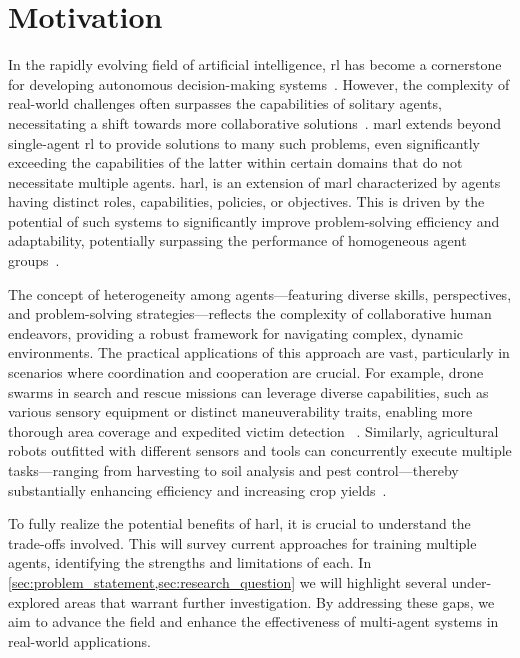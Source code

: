 \section{Motivation}%
\label{sec:motivation}

In the rapidly evolving field of artificial intelligence, \gls{rl} has become a 
cornerstone for developing autonomous decision-making systems~\cite{sutton2018}.
However, the complexity of real-world challenges often surpasses the 
capabilities of solitary agents, necessitating a shift towards more 
collaborative solutions~\cite{cao2012}.
\Gls{marl} extends beyond single-agent \gls{rl} to provide solutions to many 
such problems, even significantly exceeding the capabilities of the latter 
within certain domains that do not necessitate multiple agents. \Gls{harl}, 
is an extension of \gls{marl} characterized by agents having distinct roles, 
capabilities, policies, or objectives. This \printdoctype is driven by the 
potential of such systems to significantly improve problem-solving efficiency 
and adaptability, potentially surpassing the performance of homogeneous 
agent groups~\cite{calvo2018}.

The concept of heterogeneity among agents—featuring diverse skills, 
perspectives, and problem-solving strategies—reflects the complexity of 
collaborative human endeavors, providing a robust framework for navigating 
complex, dynamic environments. 
The practical applications of this approach are vast, particularly in 
scenarios where coordination and cooperation are crucial. For example, 
drone swarms in search and rescue missions can leverage diverse capabilities, 
such as various sensory equipment or distinct maneuverability traits, 
enabling more thorough area coverage and expedited victim detection
~\cite{hoang2023,kouzeghar2023}.
Similarly, agricultural robots outfitted with different sensors and tools can 
concurrently execute multiple tasks—ranging from harvesting to soil analysis and
pest control—thereby substantially enhancing efficiency and increasing crop 
yields~\cite{carbone2018,amarasinghe2019}.

To fully realize the potential benefits of \gls{harl}, it is crucial to 
understand the trade-offs involved. This \printdoctype will survey current 
approaches for training multiple agents, 
identifying the strengths and limitations of each. 
In \cref{sec:problem_statement,sec:research_question} we will 
highlight several under-explored areas that warrant further investigation. 
By addressing these gaps, we aim to advance the field and enhance the 
effectiveness of multi-agent systems in real-world applications.

